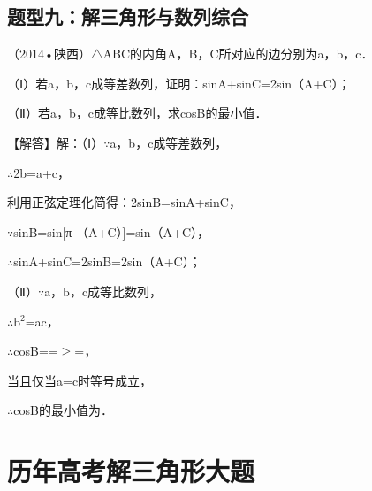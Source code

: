 \subsection{题型九：解三角形与数列综合}

\begin{question}
（2014•陕西）$\triangle$ABC的内角A，B，C所对应的边分别为a，b，c．\par
（Ⅰ）若a，b，c成等差数列，证明：sinA+sinC=2sin（A+C）；\par
（Ⅱ）若a，b，c成等比数列，求cosB的最小值．\par
\begin{solution}
【解答】解：（Ⅰ）$\because$a，b，c成等差数列，\par
$\therefore$2b=a+c，\par
利用正弦定理化简得：2sinB=sinA+sinC，\par
$\because$sinB=sin[π-（A+C）]=sin（A+C），\par
$\therefore$sinA+sinC=2sinB=2sin（A+C）；\par
（Ⅱ）$\because$a，b，c成等比数列，\par
$\therefore$b$^{2}$=ac，\par
$\therefore$cosB=\allowbreak{}=\allowbreak{}$\geq$\allowbreak{}=\allowbreak{}，\par
当且仅当a=c时等号成立，\par
$\therefore$cosB的最小值为\allowbreak{}．\par
\end{solution}
\end{question}

\section{历年高考解三角形大题}

